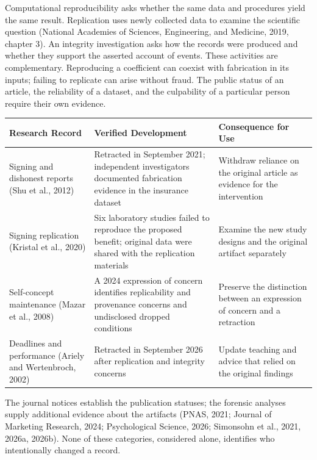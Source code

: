 \noindent \noindent Computational reproducibility asks whether the same data and
procedures yield the same result. Replication uses newly collected data
to examine the scientific question (National Academies of Sciences,
Engineering, and Medicine, 2019, chapter 3). An integrity investigation
asks how the records were produced and whether they support the asserted
account of events. These activities are complementary. Reproducing a
coefficient can coexist with fabrication in its inputs; failing to
replicate can arise without fraud. The public status of an article, the
reliability of a dataset, and the culpability of a particular person
require their own evidence.

\begin{table}[H]
\centering\small
\begin{tabular}{@{}
  >{\raggedright\arraybackslash}p{}
  >{\raggedright\arraybackslash}p{}
  >{\raggedright\arraybackslash}p{}@{}}
\toprule
Research Record & Verified Development & Consequence for Use \\
\midrule

Signing and dishonest reports (Shu et al., 2012) & Retracted in
September 2021; independent investigators documented fabrication
evidence in the insurance dataset & Withdraw reliance on the original
article as evidence for the intervention \\
Signing replication (Kristal et al., 2020) & Six laboratory studies
failed to reproduce the proposed benefit; original data were shared with
the replication materials & Examine the new study designs and the
original artifact separately \\
Self-concept maintenance (Mazar et al., 2008) & A 2024 expression of
concern identifies replicability and provenance concerns and undisclosed
dropped conditions & Preserve the distinction between an expression of
concern and a retraction \\
Deadlines and performance (Ariely and Wertenbroch, 2002) & Retracted in
September 2026 after replication and integrity concerns & Update
teaching and advice that relied on the original findings \\
\bottomrule
\end{tabular}
\end{table}

The journal notices establish the publication statuses; the forensic
analyses supply additional evidence about the artifacts (PNAS, 2021;
Journal of Marketing Research, 2024; Psychological Science, 2026;
Simonsohn et al., 2021, 2026a, 2026b). None of these categories,
considered alone, identifies who intentionally changed a record.


